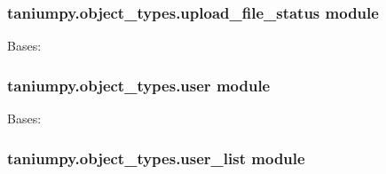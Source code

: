 \documentclass[letterpaper,10pt,english]{sphinxmanual}
\begin{document}
\subsubsection{taniumpy.object\_types.upload\_file\_status module}
\label{taniumpy.object_types:module-taniumpy.object_types.upload_file_status}\label{taniumpy.object_types:taniumpy-object-types-upload-file-status-module}

\begin{fulllineitems}
\label{taniumpy.object_types:taniumpy.object_types.upload_file_status.UploadFileStatus}
Bases: {\hyperref[taniumpy.object_types:taniumpy.object_types.base.BaseType]{}}

\end{fulllineitems}



\subsubsection{taniumpy.object\_types.user module}
\label{taniumpy.object_types:module-taniumpy.object_types.user}\label{taniumpy.object_types:taniumpy-object-types-user-module}

\begin{fulllineitems}
\label{taniumpy.object_types:taniumpy.object_types.user.User}
Bases: {\hyperref[taniumpy.object_types:taniumpy.object_types.base.BaseType]{}}

\end{fulllineitems}



\subsubsection{taniumpy.object\_types.user\_list module}
\label{taniumpy.object_types:module-taniumpy.object_types.user_list}\label{taniumpy.object_types:taniumpy-object-types-user-list-module}
\end{document}
